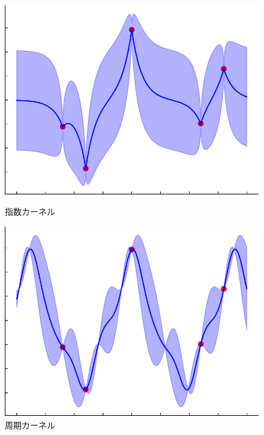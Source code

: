 \documentclass[twocolumn]{ltjarticle}
\begin{document}
\begin{figure}[htbp]
	\centering
	\begin{minipage}[c]{0.4\columnwidth}
		\centering
		\includegraphics[width=\columnwidth]{figures/gaussian_regression_exp_kernel_crop.pdf}
		\vspace*{-0.6cm}
		\caption{指数カーネル} \label{fig:exp_kernel}
	\end{minipage}
	\hspace{0.05\columnwidth}
	\begin{minipage}[c]{0.4\columnwidth}
		\centering
		\includegraphics[width=\columnwidth]{figures/gaussian_regression_sin_kernel_crop.pdf}
		\vspace*{-0.6cm}
		\caption{周期カーネル} \label{fig:sin_kernel}
	\end{minipage}
\end{figure}
\end{document}
